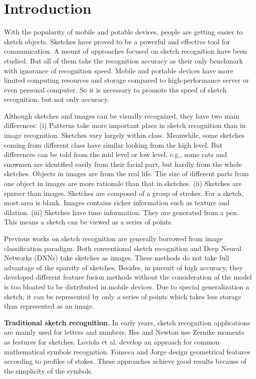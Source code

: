 \section{Introduction}
\label{sec:intro}

With the popularity of mobile and potable devices, people are getting easier to sketch objects. Sketches have proved to be a powerful and effective tool for communication. A mount of approaches focused on sketch recognition have been studied. But all of them take the recognition accuracy as their only benchmark with ignorance of recognition speed. Mobile and portable devices have more limited computing resources and storage compared to high-performance server or even personal computer. So it is necessary to promote the speed of sketch recognition, but not only accuracy.

Although sketches and images can be visually recognized, they have two main differences: (i) Patterns take more important place in sketch recognition than in image recognition. Sketches vary largely within class. Meanwhile, some sketches coming from different class have similar looking from the high level. But differences can be told from the mid level or low level, e.g., some cats and snowmen are identified easily from their facial part, but hardly from the whole sketches. Objects in images are from the real life. The size of different parts from one object in images are more rationale than that in sketches. (ii) Sketches are sparser than images. Sketches are composed of a group of strokes. For a sketch, most area is blank. Images contains richer information such as texture and dilation. (iii) Sketches have time information. They are generated from a pen. This means a sketch can be viewed as a series of points.

Previous works on sketch recognition are generally borrowed from image classification paradigm. Both conventional sketch recognition and Deep Neural Networks (DNNs) take sketches as images. These methods do not take full advantage of the sparsity of sketches. Besides, in pursuit of high accuracy, they developed different feature fusion methods without the consideration of the model is too bloated to be distributed in mobile devices. Due to special generalization a sketch, it can be represented by only a series of points which takes less storage than represented as an image.

\textbf{Traditional sketch recognition.} In early years, sketch recognition applications \cite{Hse2004SketchedSR, LaViola2004MathPad2AS, Fonseca2000UsingFL} are mainly used for letters and numbers. Hse and Newton \cite{Hse2004SketchedSR} use Zernike moments as features for sketches. Laviola et al. \cite{LaViola2004MathPad2AS} develop an approach for common mathematical symbols recognition. Fonseca and Jorge \cite{Fonseca2000UsingFL} design geometrical features  according to profiles of stokes. These approaches achieve good results because of the simplicity of the symbols.


